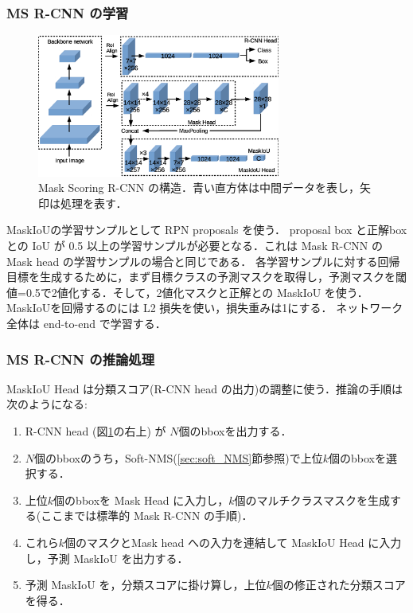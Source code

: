 \documentclass[twocolumn]{jsarticle} %
\begin{document}
\subsubsection{MS R-CNN の学習}
\begin{figure}[h]
    \begin{center}
        \includegraphics[width=8cm,clip]{fig/archi_ms_rcnn.eps}
    \end{center}
    \caption{ Mask Scoring R-CNN の構造．青い直方体は中間データを表し，矢印は処理を表す．}
    \label{fig:archi_ms_rcnn}
\end{figure}
MaskIoUの学習サンプルとして RPN proposals を使う．
proposal box と正解box との IoU が 0.5 以上の学習サンプルが必要となる．これは Mask R-CNN の Mask head の学習サンプルの場合と同じである．
各学習サンプルに対する回帰目標を生成するために，まず目標クラスの予測マスクを取得し，予測マスクを閾値=0.5で2値化する．そして，2値化マスクと正解との MaskIoU を使う．
MaskIoUを回帰するのには L2 損失を使い，損失重みは1にする．
ネットワーク全体は end-to-end で学習する．
\subsubsection{MS R-CNN の推論処理}
MaskIoU Head は分類スコア(R-CNN head の出力)の調整に使う．推論の手順は次のようになる:
\begin{enumerate}
    \item R-CNN head (図\ref{fig:archi_ms_rcnn}の右上) が $N$個のbboxを出力する．
    \item $N$個のbboxのうち，Soft-NMS\cite{BSCD17}(\ref{sec:soft_NMS}節参照)で上位$k$個のbboxを選択する．
    \item 上位$k$個のbboxを Mask Head に入力し，$k$個のマルチクラスマスクを生成する(ここまでは標準的 Mask R-CNN の手順)．
    \item これら$k$個のマスクとMask head への入力を連結して MaskIoU Head に入力し，予測 MaskIoU を出力する．
    \item 予測 MaskIoU を，分類スコアに掛け算し，上位$k$個の修正された分類スコアを得る．
\end{enumerate}
\end{document}
